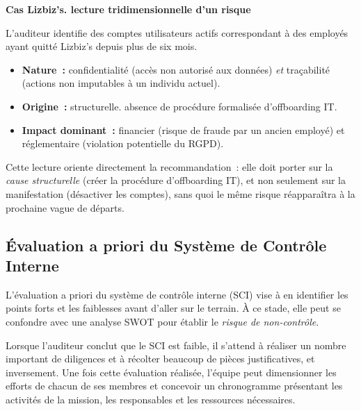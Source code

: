 \begin{boxlizbiz}
\textbf{Cas Lizbiz's. lecture tridimensionnelle d'un risque}

L'auditeur identifie des comptes utilisateurs actifs correspondant à des employés
ayant quitté Lizbiz's depuis plus de six mois.

\begin{itemize}
    \item \textbf{Nature~:} confidentialité (accès non autorisé aux données) \emph{et}
        traçabilité (actions non imputables à un individu actuel).
    \item \textbf{Origine~:} structurelle. absence de procédure formalisée
        d'offboarding IT.
    \item \textbf{Impact dominant~:} financier (risque de fraude par un ancien employé)
        et réglementaire (violation potentielle du RGPD).
\end{itemize}

Cette lecture oriente directement la recommandation~: elle doit porter sur la
\emph{cause structurelle} (créer la procédure d'offboarding IT), et non seulement sur
la manifestation (désactiver les comptes), sans quoi le même risque réapparaîtra à
la prochaine vague de départs.
\end{boxlizbiz}

\subsection{Évaluation a priori du Système de Contrôle Interne}
\label{subsec:eval-apriori-sci}

L'évaluation a priori du système de contrôle interne (SCI) vise à en identifier les
points forts et les faiblesses avant d'aller sur le terrain. À ce stade, elle peut se
confondre avec une analyse SWOT pour établir le \emph{risque de non-contrôle}.

Lorsque l'auditeur conclut que le SCI est faible, il s'attend à réaliser un nombre
important de diligences et à récolter beaucoup de pièces justificatives, et
inversement. Une fois cette évaluation réalisée, l'équipe peut dimensionner les efforts
de chacun de ses membres et concevoir un chronogramme présentant les activités de la
mission, les responsables et les ressources nécessaires.

